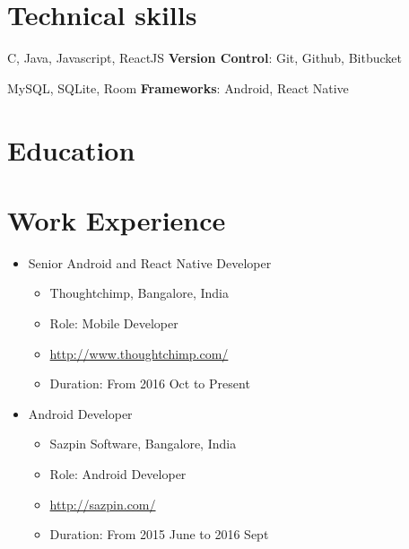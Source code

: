 \documentclass[11pt,a4paper]{moderncv}
\begin{document}
\maketitle

\section{Technical skills}
           {C, Java, Javascript, ReactJS}
           {\textbf{Version Control}: }
           {Git, Github, Bitbucket}

           {MySQL, SQLite, Room}
           {\textbf{Frameworks}: }
           {Android, React Native}

\section{Education}

\section{Work Experience}

    \begin{itemize}
        \item Senior Android and React Native Developer
        \begin{itemize}
            \item Thoughtchimp, Bangalore, India
            \item Role: Mobile Developer
            \item {\url{http://www.thoughtchimp.com/}}
            \item Duration: From 2016 Oct to Present 
        \end{itemize}
    \end{itemize}
   \begin{itemize}
        \item Android Developer
        \begin{itemize}
            \item Sazpin Software, Bangalore, India
            \item Role: Android Developer  
            \item {\url{http://sazpin.com/}}
            \item Duration: From 2015 June to 2016 Sept
        \end{itemize}
    \end{itemize}
   
\end{document}
